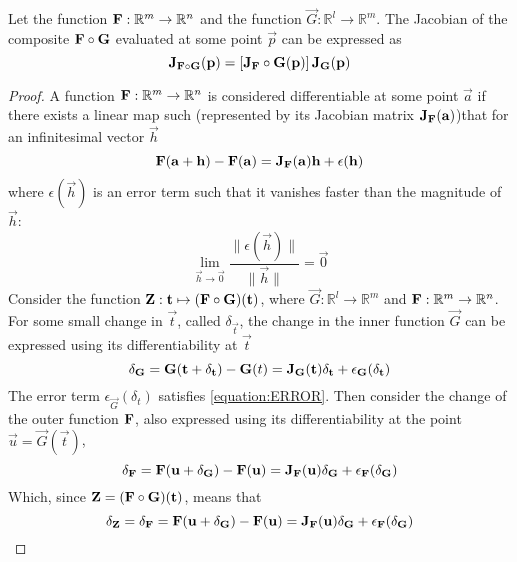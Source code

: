 \begin{lemma}\label{lemma:JACOBIAN-CHAIN}
    Let the function $\mathbf{F}:\mathbb{R}^m\rightarrow\mathbb{R}^n$ and the function $\vec{G}:\mathbb{R}^l\rightarrow\mathbb{R}^m$. The Jacobian of the composite
    $\mathbf{F}\circ\mathbf{G}$ evaluated at some point $\vec{p}$ can be expressed as
    $$
        \mathbf{J}_{\mathbf{F}\circ\mathbf{G}}(\mathbf{p})=\left[\mathbf{J}_{\mathbf{F}}\circ\mathbf{G}(\mathbf{p})\right]\mathbf{J}_{\mathbf{G}}(\mathbf{p})
    $$
    \begin{proof}
        A function $\mathbf{F}:\mathbb{R}^m\rightarrow\mathbb{R}^n$ is considered differentiable at some point $\vec{a}$ if there exists a linear map such (represented by its
        Jacobian matrix $\mathbf{J}_{\mathbf{F}}(\mathbf{a})$)that for an infinitesimal vector $\vec{h}$
        $$
            \mathbf{F}(\mathbf{a}+\mathbf{h})-\mathbf{F}(\mathbf{a})=\mathbf{J}_{\mathbf{F}}(\mathbf{a})\mathbf{h}+\epsilon(\mathbf{h})
        $$
        where $\epsilon(\vec{h})$ is an error term such that it vanishes faster than the magnitude of $\vec{h}$:
        \begin{equation}
            \label{equation:ERROR}\lim_{\vec{h}\rightarrow\vec{0}}\frac{\lVert\epsilon(\vec{h})\rVert}{\lVert\vec{h}\rVert}=\vec{0}
        \end{equation}
        Consider the function $\mathbf{Z}:\mathbf{t}\mapsto(\mathbf{F}\circ \mathbf{G})(\mathbf{t})$, where $\vec{G}:\mathbb{R}^l\rightarrow\mathbb{R}^m$ and $\mathbf{F}:\mathbb{R}^m\rightarrow\mathbb{R}^n$. For
        some small change in $\vec{t}$, called $\delta_\vec{t}$, the change in the inner function $\vec{G}$ can be expressed using its differentiability at $\vec{t}$
        \begin{equation}
            \label{equation:jacobian-chain-rule:1}\delta_{\mathbf{G}}=\mathbf{G}(\mathbf{t}+\delta_{\mathbf{t}})-\mathbf{G}(t)=\mathbf{J}_{\mathbf{G}}(\mathbf{t})\delta_{\mathbf{t}}+\epsilon_{\mathbf{G}}(\delta_{\mathbf{t}})
        \end{equation}
        The error term $\epsilon_\vec{G}(\delta_t)$ satisfies \eqref{equation:ERROR}. Then consider the change of the outer function $\mathbf{F}$, also expressed using its differentiability
        at the point $\vec{u}=\vec{G}(\vec{t})$,
        $$
            \delta_{\mathbf{F}}=\mathbf{F}(\mathbf{u}+\delta_{\mathbf{G}})-\mathbf{F}(\mathbf{u})=\mathbf{J}_{\mathbf{F}}(\mathbf{u})\delta_{\mathbf{G}}+\epsilon_{\mathbf{F}}(\delta_{\mathbf{G}})
        $$
        Which, since $\mathbf{Z}=(\mathbf{F}\circ\mathbf{G})(\mathbf{t})$, means that
        \begin{equation}
            \label{equation:jacobian-chain-rule:2}\delta_\vec{Z}=\delta_\fatf=\fatf(\vec{u}+\delta_\vec{G})-\fatf(\vec{u})=\jacobian_\fatf(\vec{u})\delta_\vec{G}+\epsilon_\fatf(\delta_\vec{G})

\end{equation}
\end{proof}
\end{lemma}
